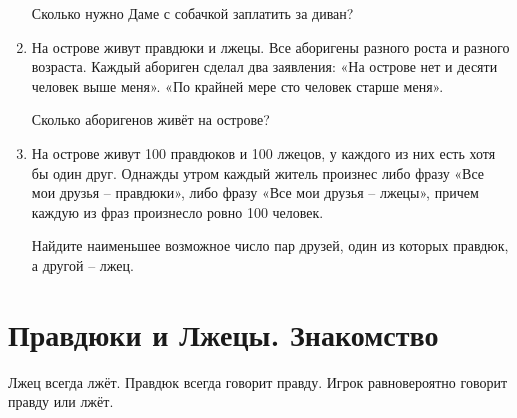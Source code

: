 \documentclass[12pt]{article}
\theoremstyle{definition}
\begin{document}
\begin{enumerate}
  Сколько нужно Даме с собачкой заплатить за диван?

  \item На острове живут правдюки и лжецы. Все аборигены разного роста и разного возраста. Каждый абориген сделал два заявления:
  «На острове нет и десяти человек выше меня». «По крайней мере сто человек старше меня».

  Сколько аборигенов живёт на острове?


  \item На острове живут 100 правдюков и 100 лжецов, у каждого из них есть хотя бы один друг. 
  Однажды утром каждый житель произнес либо фразу «Все мои друзья – правдюки», либо фразу «Все мои друзья – лжецы», 
  причем каждую из фраз произнесло ровно 100 человек. 
  
  Найдите наименьшее возможное число пар друзей, один из которых правдюк, а другой – лжец. 



\end{enumerate}


\newpage
\setcounter{section}{0}
\section{Правдюки и Лжецы. Знакомство}

Лжец всегда лжёт. Правдюк всегда говорит правду. Игрок равновероятно говорит правду или лжёт. 
\end{document}
